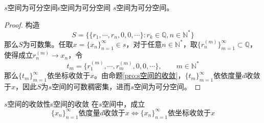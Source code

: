 \documentclass[lang = cn, scheme = chinese, thmcnt = section]{elegantbook}
\newcommand{\N}{\mathbb{N}}            %
\newcommand{\Q}{\mathbb{Q}}            %
\newcommand{\sub}{\subset}             %
\begin{document}
\begin{proposition}{$s$空间为可分空间}{s空间为可分空间}
	$s$空间为可分空间。
\end{proposition}

\begin{proof}
	构造
	$$
	S=\{ \{r_1,\cdots,r_n,0,0,\cdots\}:r_k\in\Q,n\in\N^* \}
	$$
	那么$S$为可数集。任取$x=\{x_n\}_{n=1}^{\infty}\in s$，对于任意$n\in\N^*$，取$\{ r_n^{(m)} \}_{m=1}^{\infty}\sub\Q$，使得成立$r_n^{(m)}\to x_n$，令
	$$
	t_m=\{ r_1^{(m)},\cdots, r_m^{(m)},0,0,\cdots \},\qquad m\in\N^*
	$$
	那么$\{t_m\}_{m=1}^{\infty}$依坐标收敛于$x$。由命题\ref{pro:s空间的收敛}，$\{t_m\}_{m=1}^{\infty}$依依度量$d$收敛于$x$，因此$S$为$s$空间的可数稠密集，进而$s$空间为可分空间。
\end{proof}

\begin{proposition}{$s$空间的收敛性}{s空间的收敛}
	在$s$空间中，成立
	$$
	\{x_n\}_{n=1}^{\infty}\text{依度量}d\text{收敛于}x\iff \{x_n\}_{n=1}^{\infty}\text{依坐标收敛于}x
	$$
\end{proposition}
\end{document}
